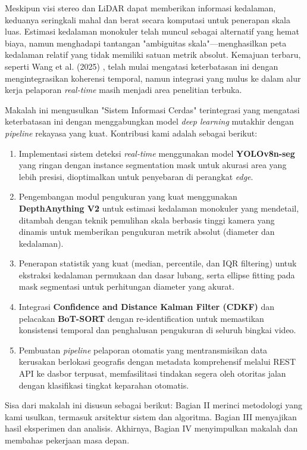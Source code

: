 \documentclass[conference]{IEEEtran}
\begin{document}
Meskipun visi stereo dan LiDAR dapat memberikan informasi kedalaman, keduanya seringkali mahal dan berat secara komputasi untuk penerapan skala luas. Estimasi kedalaman monokuler telah muncul sebagai alternatif yang hemat biaya, namun menghadapi tantangan "ambiguitas skala"---menghasilkan peta kedalaman relatif yang tidak memiliki satuan metrik absolut. Kemajuan terbaru, seperti Wang et al. (2025) \cite{wang2025}, telah mulai mengatasi keterbatasan ini dengan mengintegrasikan koherensi temporal, namun integrasi yang mulus ke dalam alur kerja pelaporan \textit{real-time} masih menjadi area penelitian terbuka.

Makalah ini mengusulkan "Sistem Informasi Cerdas" terintegrasi yang mengatasi keterbatasan ini dengan menggabungkan model \textit{deep learning} mutakhir dengan \textit{pipeline} rekayasa yang kuat. Kontribusi kami adalah sebagai berikut:
\begin{enumerate}
    \item Implementasi sistem deteksi \textit{real-time} menggunakan model \textbf{YOLOv8n-seg} yang ringan dengan instance segmentation mask untuk akurasi area yang lebih presisi, dioptimalkan untuk penyebaran di perangkat \textit{edge}.
    \item Pengembangan modul pengukuran yang kuat menggunakan \textbf{DepthAnything V2} untuk estimasi kedalaman monokuler yang mendetail, ditambah dengan teknik pemulihan skala berbasis tinggi kamera yang dinamis untuk memberikan pengukuran metrik absolut (diameter dan kedalaman).
    \item Penerapan statistik yang kuat (median, percentile, dan IQR filtering) untuk ekstraksi kedalaman permukaan dan dasar lubang, serta ellipse fitting pada mask segmentasi untuk perhitungan diameter yang akurat.
    \item Integrasi \textbf{Confidence and Distance Kalman Filter (CDKF)} dan pelacakan \textbf{BoT-SORT} dengan re-identification untuk memastikan konsistensi temporal dan penghalusan pengukuran di seluruh bingkai video.
    \item Pembuatan \textit{pipeline} pelaporan otomatis yang mentransmisikan data kerusakan berlokasi geografis dengan metadata komprehensif melalui REST API ke dasbor terpusat, memfasilitasi tindakan segera oleh otoritas jalan dengan klasifikasi tingkat keparahan otomatis.
\end{enumerate}

Sisa dari makalah ini disusun sebagai berikut: Bagian II merinci metodologi yang kami usulkan, termasuk arsitektur sistem dan algoritma. Bagian III menyajikan hasil eksperimen dan analisis. Akhirnya, Bagian IV menyimpulkan makalah dan membahas pekerjaan masa depan.
\end{document}
